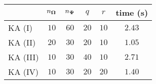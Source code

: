 \centering
\renewcommand{\arraystretch}{1.2}
\begin{tabular}{@{}lccccc@{}}
\toprule
 & $n_{\boldsymbol{\Omega}}$ & $n_{\boldsymbol{\Psi}}$ & $q$ & $r$ & time (s)\\
\midrule
KA (I) & $10$ & $60$ & $20$ & $10$ & $2.43$ \\
KA (II) & $20$ & $30$ & $20$ & $10$ & $1.05$ \\
KA (III) & $10$ & $30$ & $40$ & $10$ & $2.71$ \\
KA (IV) & $10$ & $30$ & $20$ & $20$ & $1.40$ \\
\bottomrule
\end{tabular}
